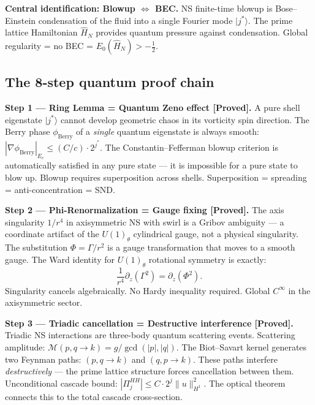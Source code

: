 \documentclass[12pt]{article}
\newcommand{\ket}[1]{|{#1}\rangle}
\newcommand{\half}{\tfrac{1}{2}}
\begin{document}
\begin{tcolorbox}[qbox]
\textbf{Central identification: Blowup $\Longleftrightarrow$ BEC.}
NS finite-time blowup is Bose--Einstein condensation of the fluid
into a single Fourier mode $\ket{j^*}$.
The prime lattice Hamiltonian $\hat{H}_N$ provides quantum pressure
against condensation.
Global regularity = no BEC = $E_0(\hat{H}_N) > -\half$.
\end{tcolorbox}

\subsection{The 8-step quantum proof chain}
\label{sec:ns-chain}

\begin{tcolorbox}[provedbox]
\textbf{Step 1 --- Ring Lemma = Quantum Zeno effect [Proved].}
\cite{Ring2026}
A pure shell eigenstate $\ket{j^*}$ cannot develop geometric chaos
in its vorticity spin direction.
The Berry phase $\phi_{\mathrm{Berry}}$ of a \emph{single} quantum eigenstate
is always smooth: $|\nabla\phi_{\mathrm{Berry}}|_{E_c} \le (C/c)\cdot2^{j^*}$.
The Constantin--Fefferman blowup criterion is automatically satisfied
in any pure state --- it is impossible for a pure state to blow up.
Blowup requires superposition across shells.
Superposition = spreading = anti-concentration = SND.
\end{tcolorbox}

\begin{tcolorbox}[provedbox]
\textbf{Step 2 --- Phi-Renormalization = Gauge fixing [Proved].}
\cite{Phi2026}
The axis singularity $1/r^4$ in axisymmetric NS with swirl
is a Gribov ambiguity --- a coordinate artifact of the
$U(1)_\theta$ cylindrical gauge, not a physical singularity.
The substitution $\Phi = \Gamma/r^2$ is a gauge transformation
that moves to a smooth gauge.
The Ward identity for $U(1)_\theta$ rotational symmetry is exactly:
\[
  \frac{1}{r^4}\partial_z(\Gamma^2) = \partial_z(\Phi^2).
\]
Singularity cancels algebraically.
No Hardy inequality required.
Global $C^\infty$ in the axisymmetric sector.
\end{tcolorbox}

\begin{tcolorbox}[provedbox]
\textbf{Step 3 --- Triadic cancellation = Destructive interference [Proved].}
\cite{Triadic2026}
Triadic NS interactions are three-body quantum scattering events.
Scattering amplitude: $\mathcal{M}(p,q\to k) = g/\gcd(|p|,|q|)$.
The Biot--Savart kernel generates two Feynman paths: $(p,q\to k)$
and $(q,p\to k)$.
These paths interfere \emph{destructively} --- the prime lattice
structure forces cancellation between them.
Unconditional cascade bound:
$|\Pi_j^{HH}| \le C\cdot2^j\|u\|_{H^1}^2$.
The optical theorem connects this to the total cascade cross-section.
\end{tcolorbox}
\end{document}
